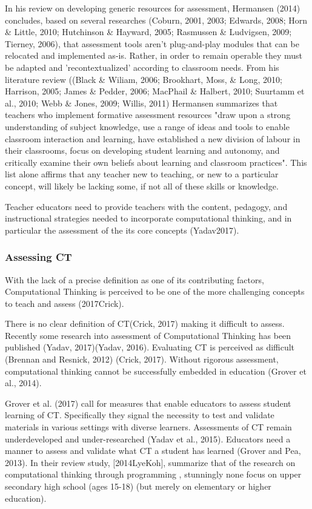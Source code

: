 In his review on developing generic resources for assessment, Hermansen (2014) concludes, based on several researches (Coburn, 2001, 2003; Edwards, 2008; Horn \& Little, 2010; Hutchinson \& Hayward, 2005; Rasmussen \& Ludvigsen, 2009; Tierney, 2006), that assessment tools aren't plug-and-play modules that can be relocated and implemented as-is. Rather, in order to remain operable they must be adapted and 'recontextualized' according to classroom needs. From his literature review ((Black \& Wiliam, 2006; Brookhart, Moss, \& Long, 2010; Harrison, 2005; James \& Pedder, 2006; MacPhail \& Halbert, 2010; Suurtamm et al., 2010; Webb \& Jones, 2009; Willis, 2011) Hermansen summarizes that teachers who implement formative assessment resources "draw upon a strong understanding of subject knowledge, use a range of ideas and tools to enable classroom interaction and learning, have established a new division of labour in their classrooms, focus on developing student learning and autonomy, and critically examine their own beliefs about learning and classroom practices". This list alone affirms that any teacher new to teaching, or new to a particular concept, will likely be lacking some, if not all of these skills or knowledge.


Teacher educators need to provide teachers with the content, pedagogy, and instructional strategies needed to incorporate computational thinking, and in particular the assessment of the its core concepts (Yadav2017).



\subsubsection*{Assessing CT}
With the lack of a precise definition as one of its contributing factors, Computational Thinking is perceived to be one of the more challenging concepts to teach and assess (2017Crick).

There is no clear definition of CT(Crick, 2017) making it difficult to assess. Recently some research into assessment of Computational Thinking has been published (Yadav, 2017)(Yadav, 2016). Evaluating CT is perceived as difficult (Brennan and Resnick, 2012) (Crick, 2017).
Without rigorous assessment, computational thinking cannot be successfully embedded in education (Grover et al., 2014).

Grover et al. (2017) call for measures that enable educators to assess student learning of CT.  Specifically they signal the necessity to test and validate materials in various settings with diverse learners.
Assessments of CT remain underdeveloped and under-researched (Yadav et al., 2015).
Educators need a manner to assess and validate what CT a student has learned (Grover and Pea, 2013).
In their review study, [2014LyeKoh], summarize that of the research on computational thinking through programming , stunningly none focus on upper secondary high school (ages 15-18) (but merely on elementary or higher education).


